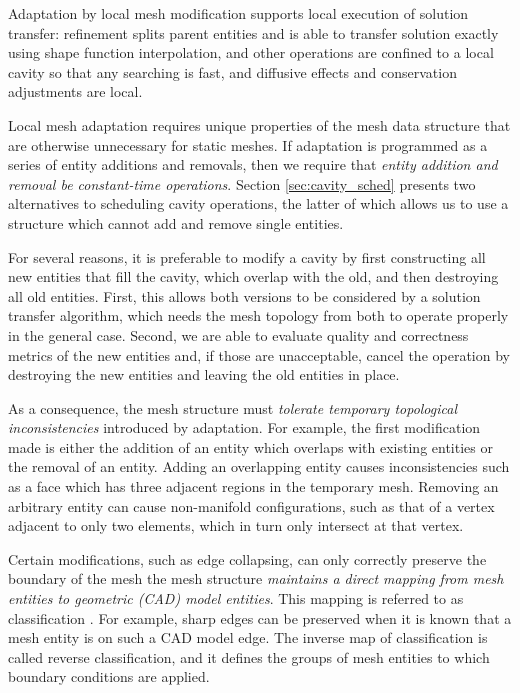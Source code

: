 Adaptation by local mesh modification supports local execution
of solution transfer: refinement splits
parent entities and is able to transfer solution exactly using
shape function interpolation, and other operations are confined
to a local cavity so that any searching is fast,
and diffusive effects and conservation adjustments are local.

Local mesh adaptation requires unique properties of the
mesh data structure that are otherwise unnecessary for
static meshes.
If adaptation is programmed as a series of entity
additions and removals, then we require that \emph{entity
addition and removal be constant-time operations}.
Section \ref{sec:cavity_sched} presents two alternatives
to scheduling cavity operations, the latter of which
allows us to use a structure which cannot add and remove
single entities.

For several reasons, it is preferable to modify a cavity
by first constructing all new entities that fill the cavity,
which overlap with the old, and then destroying all old entities.
First, this allows both versions to be considered by a solution
transfer algorithm, which needs the mesh topology from both
to operate properly in the general case.
Second, we are able to evaluate quality and correctness metrics
of the new entities and, if those are unacceptable, cancel the
operation by destroying the new entities and leaving
the old entities in place.

As a consequence, the mesh structure must \emph{tolerate temporary
topological inconsistencies} introduced by adaptation.
For example, the first modification made is either the addition
of an entity which overlaps with existing entities
or the removal of an entity.
Adding an overlapping entity causes inconsistencies such as
a face which has three adjacent regions in the temporary mesh.
Removing an arbitrary entity can cause non-manifold configurations,
such as that of a vertex adjacent to only two elements, which
in turn only intersect at that vertex.

Certain modifications, such as edge collapsing, can only correctly
preserve the boundary of the mesh the mesh structure \emph{maintains
a direct mapping from mesh entities to geometric (CAD) model
entities}.
This mapping is referred to as classification \cite{schroeder1990combined}.
For example, sharp edges
can be preserved when it is known that a mesh entity is
on such a CAD model edge.
The inverse map of classification is called reverse
classification, and it defines the groups of mesh entities
to which boundary conditions are applied.

